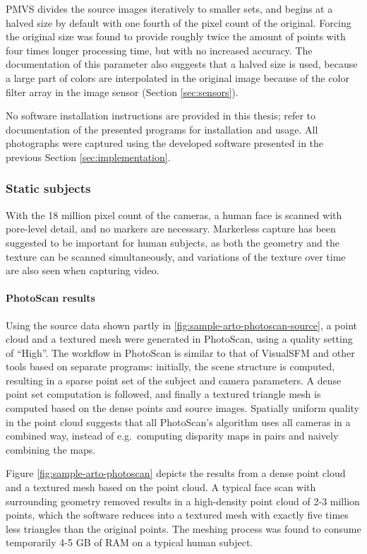 PMVS divides the source images iteratively to smaller sets, and begins at a halved size by default with one fourth of the pixel count of the original.
Forcing the original size was found to provide roughly twice the amount of points with four times longer processing time, but with no increased accuracy.
The documentation of this parameter also suggests that a halved size is used, because a large part of colors are interpolated in the original image because of the color filter array in the image sensor (Section \ref{sec:sensors}).

No software installation instructions are provided in this thesis; refer to documentation of the presented programs for installation and usage.
All photographs were captured using the developed software presented in the previous Section \ref{sec:implementation}.

\subsubsection{Static subjects}

With the 18 million pixel count of the cameras, a human face is scanned with pore-level detail, and no markers are necessary.
Markerless capture has been suggested to be important for human subjects, as both the geometry and the texture can be scanned simultaneously, and variations of the texture over time are also seen when capturing video. \cite{bradley2010high}

\paragraph{PhotoScan results}
Using the source data shown partly in \ref{fig:sample-arto-photoscan-source}, a point cloud and a textured mesh were generated in PhotoScan, using a quality setting of ``High''.
The workflow in PhotoScan is similar to that of VisualSFM and other tools based on separate programs:
initially, the scene structure is computed, resulting in a sparse point set of the subject and camera parameters.
A dense point set computation is followed, and finally a textured triangle mesh is computed based on the dense points and source images.
Spatially uniform quality in the point cloud suggests that all PhotoScan's algorithm uses all cameras in a combined way, instead of e.g.\ computing disparity maps in pairs and naively combining the maps.

Figure \ref{fig:sample-arto-photoscan} depicts the results from a dense point cloud and a textured mesh based on the point cloud.
A typical face scan with surrounding geometry removed results in a high-density point cloud of 2-3 million points, which the software reduces into a textured mesh with exactly five times less triangles than the original points.
The meshing process was found to consume temporarily 4-5 GB of RAM on a typical human subject.


